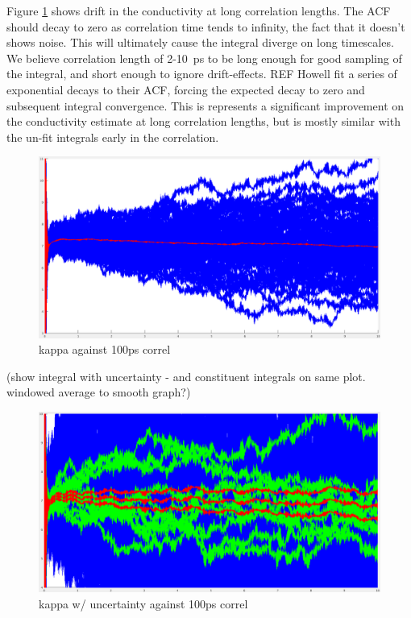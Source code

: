 \documentclass[%
preprint,                                  %
nofootinbib,
 amsmath,amssymb,
 aps,
]{revtex4-1}
\begin{document}
Figure \ref{fig:int_drift} shows drift in the conductivity at long correlation lengths. The ACF should decay to zero as correlation time tends to infinity, the fact that it doesn't shows noise. This will ultimately cause the integral diverge on long timescales. We believe correlation length of 2-10~ps to be long enough for good sampling of the integral, and short enough to ignore drift-effects. REF Howell fit a series of exponential decays to their ACF, forcing the expected decay to zero and subsequent integral convergence. This is represents a significant improvement on the conductivity estimate at long correlation lengths, but is mostly similar with the un-fit integrals early in the correlation.   

\begin{figure}[h!]
  \includegraphics[width=\linewidth]{images/4x4x3_01-z-ints.png}
  \caption{kappa against 100ps correl}
  \label{fig:int_drift}
\end{figure}



(show integral with uncertainty - and constituent integrals on same plot. windowed average to smooth graph?)

\begin{figure}[h!]
  \includegraphics[width=\linewidth]{images/6x6x4_01-z-stddev.png}
  \caption{kappa w/ uncertainty against 100ps correl}
  \label{fig:664z_100ps}
\end{figure}
\end{document}

